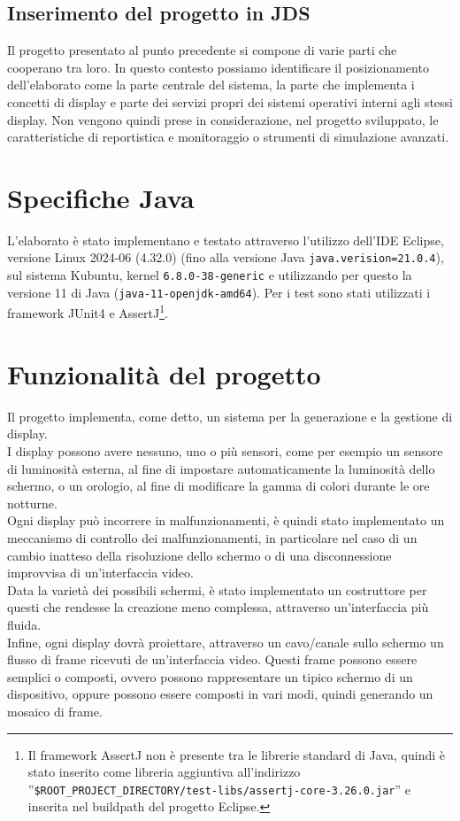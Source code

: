 \documentclass[a4paper,11pt]{article}
\begin{document}
	\subsection{Inserimento del progetto in JDS} \label{jds:inserimento-elaborato}
	Il progetto presentato al punto precedente si compone di varie parti che cooperano tra loro. In questo contesto possiamo identificare il posizionamento dell'elaborato come la parte centrale del sistema, la parte che implementa i concetti di display e parte dei servizi propri dei sistemi operativi interni agli stessi display. Non vengono quindi prese in considerazione, nel progetto sviluppato, le caratteristiche di reportistica e monitoraggio o strumenti di simulazione avanzati.
		
	\section{Specifiche Java}
	L'elaborato è stato implementano e testato attraverso l'utilizzo dell'IDE Eclipse, versione Linux 2024-06 (4.32.0) (fino alla versione Java \texttt{java.verision=21.0.4}), sul sistema Kubuntu, kernel \texttt{6.8.0-38-generic} e utilizzando per questo la versione 11 di Java (\texttt{java-11-openjdk-amd64}).
	Per i test sono stati utilizzati i framework JUnit4 e AssertJ\footnote{Il framework AssertJ non è presente tra le librerie standard di Java, quindi è stato inserito come libreria aggiuntiva all'indirizzo ''\texttt{\$ROOT\_PROJECT\_DIRECTORY/test-libs/assertj-core-3.26.0.jar}'' e inserita nel buildpath del progetto Eclipse.}.
	\section{Funzionalità del progetto}
	Il progetto implementa, come detto, un sistema per la generazione e la gestione di display.\\
	I display possono avere nessuno, uno o più sensori, come per esempio un sensore di luminosità esterna, al fine di impostare automaticamente la luminosità dello schermo, o un orologio, al fine di modificare la gamma di colori durante le ore notturne.\\
	Ogni display può incorrere in malfunzionamenti, è quindi stato implementato un meccanismo di controllo dei malfunzionamenti, in particolare nel caso di un cambio inatteso della risoluzione dello schermo o di una disconnessione improvvisa di un'interfaccia video.\\
	Data la varietà dei possibili schermi, è stato implementato un costruttore per questi che rendesse la creazione meno complessa, attraverso un'interfaccia più fluida.\\
	Infine, ogni display dovrà proiettare, attraverso un cavo/canale sullo schermo un flusso di frame ricevuti de un'interfaccia video. Questi frame possono essere semplici o composti, ovvero possono rappresentare un tipico schermo di un dispositivo, oppure possono essere composti in vari modi, quindi generando un mosaico di frame.
\end{document}
